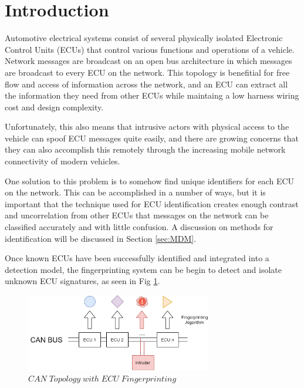 \documentclass[conference]{IEEEtran}
\begin{document}
\maketitle



\section{Introduction}

Automotive electrical systems consist of several physically isolated Electronic Control Units (ECUs) that control various functions and operations of a vehicle. Network messages are broadcast on an open bus architecture in which messages are broadcast to every ECU on the network. This topology is benefitial for free flow and access of information across the network, and an ECU can extract all the information they need from other ECUs while maintaing a low harness wiring cost and design complexity.

Unfortunately, this also means that intrusive actors with physical access to the vehicle can spoof ECU messages quite easily, and there are growing concerns that they can also accomplish this remotely through the increasing mobile network connectivity of modern vehicles.

One solution to this problem is to somehow find unique identifiers for each ECU on the network. This can be accomplished in a number of ways, but it is important that the technique used for ECU identification creates enough contrast and uncorrelation from other ECUs that messages on the network can be classified accurately and with little confusion. A discussion on methods for identification will be discussed in Section \ref{sec:MDM}.

Once known ECUs have been successfully identified and integrated into a detection model, the fingerprinting system can be begin to detect and isolate unknown ECU signatures, as seen in Fig \ref{fig:NetworkTopology}.

\begin{figure}[htb]
\centering
\includegraphics[width=3.2in]{figures/01_Fingerprinting.png}
\caption{$CAN  \; Topology  \; with  \; ECU \;  Fingerprinting$}
\label{fig:NetworkTopology}
\end{figure}
\end{document}

